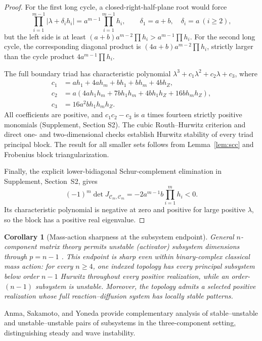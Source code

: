 \documentclass[11pt]{article}
\newtheorem{corollary}[theorem]{Corollary}
\theoremstyle{definition}
\newcommand{\1}{\mathbf 1}
\newcommand{\cC}{\mathcal C}
\begin{document}
\begin{proof}
For the first long cycle, a closed-right-half-plane root would force
\[
 \prod_{i=1}^{m-1}|\lambda+\delta_i h_i|
 =a^{m-1}\prod_{i=1}^{m-1}h_i,
 \qquad \delta_1=a+b,\quad\delta_i=a\ (i\ge2),
\]
but the left side is at least
$(a+b)a^{m-2}\prod h_i>a^{m-1}\prod h_i$.
For the second long cycle, the corresponding diagonal product is
$(4a+b)a^{m-2}\prod h_i$, strictly larger than the cycle product
$4a^{m-1}\prod h_i$.

The full boundary triad has characteristic polynomial
$\lambda^3+c_1\lambda^2+c_2\lambda+c_3$, where
\begin{align}
c_1&=ah_1+4ah_m+bh_1+bh_m+4bh_Z,\nonumber\\
c_2&=a(4ah_1h_m+7bh_1h_m+4bh_1h_Z+16bh_mh_Z),\label{eq:triad}\\
c_3&=16a^2bh_1h_mh_Z.\nonumber
\end{align}
All coefficients are positive, and $c_1c_2-c_3$ is $a$ times fourteen
strictly positive monomials (Supplement, Section S2).  The cubic
Routh--Hurwitz criterion and direct one- and two-dimensional checks establish
Hurwitz stability of every triad principal block.  The result for all smaller
sets follows from Lemma~\ref{lem:scc} and Frobenius block triangularization.

Finally, the explicit lower-bidiagonal Schur-complement elimination in
Supplement, Section~S2, gives
\begin{equation}\label{eq:coreminor}
 (-1)^m\det J_{\cC_m,\cC_m}
 =-2a^{m-1}b\prod_{i=1}^m h_i<0.
\end{equation}
Its characteristic polynomial is negative at zero and positive for large
positive $\lambda$, so the block has a positive real eigenvalue.
\end{proof}

\begin{corollary}[Mass-action sharpness at the subsystem endpoint]\label{cor:endpoint}
General $n$-component matrix theory permits unstable (activator) subsystem
dimensions through $p=n-1$ \cite{Satnoianu2000}.  This endpoint is sharp even
within binary-complex classical mass action: for every $n\ge4$, one indexed
topology has every principal subsystem below order $n-1$ Hurwitz throughout
every positive realization, while an order-$(n-1)$ subsystem is unstable.
Moreover, the topology admits a selected positive realization whose full
reaction--diffusion system has locally stable patterns.
\end{corollary}
Anma, Sakamoto, and Yoneda \cite{Anma2012} provide complementary analysis of
stable--unstable and unstable--unstable pairs of subsystems in the
three-component setting, distinguishing steady and wave instability.
\end{document}
